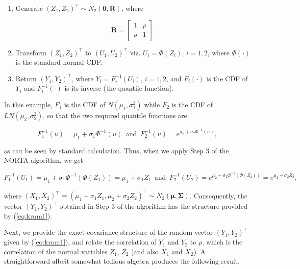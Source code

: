 \documentclass[
]{jss}
\begin{document}
\begin{enumerate}

\item Generate $(Z_1, Z_2)^\top \sim N_2(\boldsymbol 0, \boldsymbol R)$, where 

\begin{equation}
\label{eq:kram3}
\boldsymbol R = 
\left[
\begin{array}{cc}
1 & \rho \\
\rho & 1
\end{array}
\right].
\end{equation}


\item Transform $(Z_1, Z_2)^\top$ to $(U_1, U_2)^\top$ viz. $U_i =\Phi(Z_i)$,  $i=1,2$, where $\Phi(\cdot)$ is the standard normal CDF. 

\item Return $(Y_1, Y_2)^\top$, where $Y_i=F_i^{-1}(U_i)$, $i=1,2$, and $F_i(\cdot)$ is the CDF of $Y_i$ and $F_i^{-1}(\cdot)$ is its inverse (the quantile function). 

\end{enumerate}

In this example, \(F_1\) is the CDF of \(N(\mu_1, \sigma_1^2)\) while
\(F_2\) is the CDF of \(LN(\mu_2, \sigma_2^2)\), so that the two
required quantile functions are

\begin{equation}
\label{eq:kram4}
F_1^{-1}(u) = \mu_1+\sigma_1 \Phi^{-1}(u)\,\,\, \mbox{and} \,\,\, F_2^{-1}(u) = e^{\mu_2+\sigma_2 \Phi^{-1}(u)}, 
\end{equation}

as can be seen by standard calculation. Thus, when we apply Step 3 of
the NORTA algorithm, we get

\begin{equation}
\label{eq:kram5}
F_1^{-1}(U_1) = \mu_1+\sigma_1 \Phi^{-1}(\Phi(Z_1)) =  \mu_1+\sigma_1 Z_1 \,\,\, \mbox{and} \,\,\, F_2^{-1}(U_2) = e^{\mu_2+\sigma_2 \Phi^{-1}(\Phi(Z_2))} = e^{\mu_2+\sigma_2 Z_2}, 
\end{equation}

where
\((X_1, X_2)^\top = (\mu_1+\sigma_1 Z_1, \mu_2+\sigma_2 Z_2)^\top \sim N_2(\boldsymbol \mu, \boldsymbol \Sigma)\).
Consequently, the vector \((Y_1, Y_2)^\top\) obtained in Step 3 of the
algorithm has the structure provided by (\ref{eq:kram1}).

\vspace{0.1in}

\noindent Next, we provide the exact covariance structure of the random
vector \((Y_1, Y_2)^\top\) given by (\ref{eq:kram1}), and relate the
correlation of \(Y_1\) and \(Y_2\) to \(\rho\), which is the correlation
of the normal variables \(Z_1\), \(Z_2\) (and also \(X_1\) and \(X_2\)).
A straightforward albeit somewhat tedious algebra produces the following
result.
\end{document}
